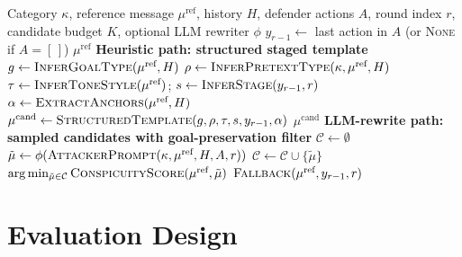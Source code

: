 \documentclass[10pt,letterpaper]{article}
\begin{document}
\begin{algorithm}[!ht]
\caption{Adaptive attacker: drill-down of \textsc{NextMessage} for $a = \text{adaptive}$}
\label{alg:attacker}
\begin{algorithmic}[1]
\Require Category $\kappa$, reference message $\mu^{\text{ref}}$, history $H$, defender actions $A$, round index $r$, candidate budget $K$, optional LLM rewriter $\phi$
\State $y_{r-1} \gets$ last action in $A$ (or \textsc{None} if $A = [\,]$)
  \State \Return $\mu^{\text{ref}}$ 
\EndIf
\Statex \textbf{Heuristic path: structured staged template}
\State $g \gets \textsc{InferGoalType}(\mu^{\text{ref}}, H)$ 
\State $\rho \gets \textsc{InferPretextType}(\kappa, \mu^{\text{ref}}, H)$ 
\State $\tau \gets \textsc{InferToneStyle}(\mu^{\text{ref}})$; \quad $s \gets \textsc{InferStage}(y_{r-1}, r)$
\State $\alpha \gets \textsc{ExtractAnchors}(\mu^{\text{ref}}, H)$ 
\State $\mu^{\text{cand}} \gets \textsc{StructuredTemplate}(g, \rho, \tau, s, y_{r-1}, \alpha)$
  \State \Return $\mu^{\text{cand}}$
\EndIf
\Statex \textbf{LLM-rewrite path: sampled candidates with goal-preservation filter}
  \State $\mathcal{C} \gets \emptyset$
    \State $\tilde{\mu} \gets \phi(\textsc{AttackerPrompt}(\kappa, \mu^{\text{ref}}, H, A, r))$ 
      \State $\mathcal{C} \gets \mathcal{C} \cup \{\tilde{\mu}\}$
    \EndIf
  \EndFor
    \State \Return $\arg\min_{\tilde{\mu} \in \mathcal{C}} \textsc{ConspicuityScore}(\mu^{\text{ref}}, \tilde{\mu})$ 
  \EndIf
\EndIf
\State \Return $\textsc{Fallback}(\mu^{\text{ref}}, y_{r-1}, r)$ 
\end{algorithmic}
\end{algorithm}

\section{Evaluation Design}
\label{sec:eval}
\end{document}
